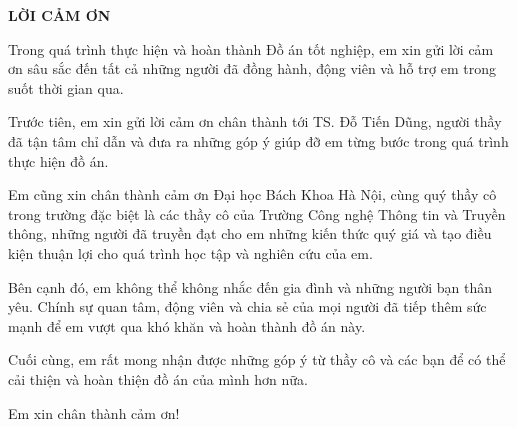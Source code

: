 \documentclass[../DoAn.tex]{subfiles}
\begin{document}
\begin{center}
    \Large{\textbf{LỜI CẢM ƠN}}\\
\end{center}
\vspace{1cm}
Trong quá trình thực hiện và hoàn thành Đồ án tốt nghiệp, em xin gửi lời cảm ơn sâu sắc đến tất cả những người đã đồng hành, động viên và hỗ trợ em trong suốt thời gian qua.

Trước tiên, em xin gửi lời cảm ơn chân thành tới TS. Đỗ Tiến Dũng, người thầy đã tận tâm chỉ dẫn và đưa ra những góp ý giúp đỡ em từng bước trong quá trình thực hiện đồ án.

Em cũng xin chân thành cảm ơn Đại học Bách Khoa Hà Nội, cùng quý thầy cô trong trường đặc biệt là các thầy cô của Trường Công nghệ Thông tin và Truyền thông, những người đã truyền đạt cho em những kiến thức quý giá và tạo điều kiện thuận lợi cho quá trình học tập và nghiên cứu của em.

Bên cạnh đó, em không thể không nhắc đến gia đình và những người bạn thân yêu. Chính sự quan tâm, động viên và chia sẻ của mọi người đã tiếp thêm sức mạnh để em vượt qua khó khăn và hoàn thành đồ án này.

Cuối cùng, em rất mong nhận được những góp ý từ thầy cô và các bạn để có thể cải thiện và hoàn thiện đồ án của mình hơn nữa.

Em xin chân thành cảm ơn!
\end{document}
